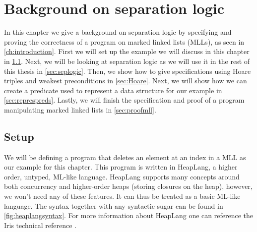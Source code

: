 \documentclass[thesis.tex]{subfiles}
\begin{document}
\chapter{Background on separation logic}

In this chapter we give a background on separation logic by specifying and proving the correctness of a program on marked linked lists (MLLs), as seen in \cref*{ch:introduction}. First we will set up the example we will discuss in this chapter in \cref*{sec:irissetup}. Next, we will be looking at separation logic as we will use it in the rest of this thesis in \cref*{sec:seplogic}. Then, we show how to give specifications using Hoare triples and weakest preconditions in \cref*{sec:Hoare}. Next, we will show how we can create a predicate used to represent a data structure for our example in \cref*{sec:represpreds}. Lastly, we will finish the specification and proof of a program manipulating marked linked lists in \cref*{sec:proofmll}.

\section{Setup}
\label{sec:irissetup}
We will be defining a program that deletes an element at an index in a MLL as our example for this chapter. This program is written in HeapLang, a higher order, untyped, ML-like language. HeapLang supports many concepts around both concurrency and higher-order heaps (storing closures on the heap), however, we won't need any of these features. It can thus be treated as a basic ML-like language. The syntax together with any syntactic sugar can be found in \cref*{fig:heaplangsyntax}. For more information about HeapLang one can reference the Iris technical reference \cite*{iristeamIrisReference2023}.
\end{document}
